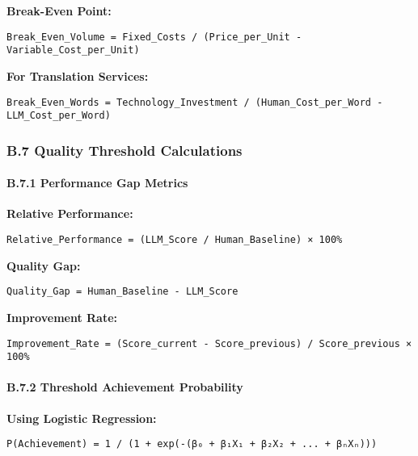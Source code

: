 \documentclass[12pt,a4paper]{article}
\begin{document}
{{{{{\textbf{Break-Even Point:}

\begin{verbatim}
Break_Even_Volume = Fixed_Costs / (Price_per_Unit - Variable_Cost_per_Unit)
\end{verbatim}

\textbf{For Translation Services:}

\begin{verbatim}
Break_Even_Words = Technology_Investment / (Human_Cost_per_Word - LLM_Cost_per_Word)
\end{verbatim}

\hypertarget{b.7-quality-threshold-calculations}{%
\subsubsection{B.7 Quality Threshold
Calculations}\label{b.7-quality-threshold-calculations}}

\hypertarget{b.7.1-performance-gap-metrics}{%
\paragraph{B.7.1 Performance Gap
Metrics}\label{b.7.1-performance-gap-metrics}}

\textbf{Relative Performance:}

\begin{verbatim}
Relative_Performance = (LLM_Score / Human_Baseline) × 100%
\end{verbatim}

\textbf{Quality Gap:}

\begin{verbatim}
Quality_Gap = Human_Baseline - LLM_Score
\end{verbatim}

\textbf{Improvement Rate:}

\begin{verbatim}
Improvement_Rate = (Score_current - Score_previous) / Score_previous × 100%
\end{verbatim}

\hypertarget{b.7.2-threshold-achievement-probability}{%
\paragraph{B.7.2 Threshold Achievement
Probability}\label{b.7.2-threshold-achievement-probability}}

\textbf{Using Logistic Regression:}

\begin{verbatim}
P(Achievement) = 1 / (1 + exp(-(β₀ + β₁X₁ + β₂X₂ + ... + βₙXₙ)))
\end{verbatim}

}}}}}
\end{document}
